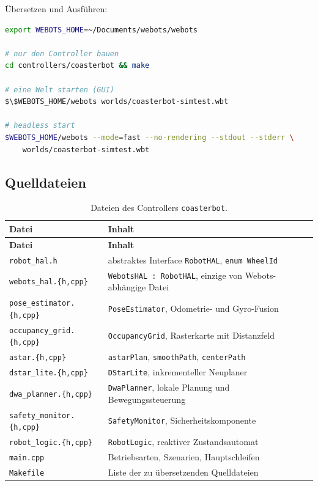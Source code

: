 \documentclass[
  a4paper,
  12pt,
  DIV=12,        %
  parskip=half,  %
  headings=small %
]{scrartcl}
\theoremstyle{definition}
\theoremstyle{definition}
\begin{document}
Übersetzen und Ausführen:

\begin{lstlisting}[style=cpp, language=bash]
export WEBOTS_HOME=~/Documents/webots/webots

# nur den Controller bauen
cd controllers/coasterbot && make

# eine Welt starten (GUI)
$\$WEBOTS_HOME/webots worlds/coasterbot-simtest.wbt

# headless start
$WEBOTS_HOME/webots --mode=fast --no-rendering --stdout --stderr \
    worlds/coasterbot-simtest.wbt
\end{lstlisting}

\subsection{Quelldateien}\label{quelldateien}

\begin{longtable}[]{@{}
  >{\raggedright\arraybackslash}p{}
  >{\raggedright\arraybackslash}p{}@{}}
\caption{Dateien des Controllers \texttt{coasterbot}.}\label{tab:dateien}\\
\toprule
\textbf{Datei} & \textbf{Inhalt}\\
\midrule
\endfirsthead
\toprule
\textbf{Datei} & \textbf{Inhalt}\\
\midrule
\endhead
\bottomrule
\endfoot
\texttt{robot\_hal.h} & abstraktes Interface \texttt{RobotHAL}, \texttt{enum WheelId}\\
\texttt{webots\_hal.\{h,cpp\}} & \texttt{WebotsHAL : RobotHAL}, einzige von Webots-abhängige Datei\\
\texttt{pose\_estimator.\{h,cpp\}} & \texttt{PoseEstimator}, Odometrie- und Gyro-Fusion\\
\texttt{occupancy\_grid.\{h,cpp\}} & \texttt{OccupancyGrid}, Rasterkarte mit Distanzfeld\\
\texttt{astar.\{h,cpp\}} & \texttt{astarPlan}, \texttt{smoothPath}, \texttt{centerPath}\\
\texttt{dstar\_lite.\{h,cpp\}} & \texttt{DStarLite}, inkrementeller Neuplaner\\
\texttt{dwa\_planner.\{h,cpp\}} & \texttt{DwaPlanner}, lokale Planung und Bewegungssteuerung\\
\texttt{safety\_monitor.\{h,cpp\}} & \texttt{SafetyMonitor}, Sicherheitskomponente\\
\texttt{robot\_logic.\{h,cpp\}} & \texttt{RobotLogic}, reaktiver Zustandsautomat\\
\texttt{main.cpp} & Betriebsarten, Szenarien, Hauptschleifen\\
\texttt{Makefile} & Liste der zu übersetzenden Quelldateien\\
\bottomrule
\end{longtable}
\end{document}
